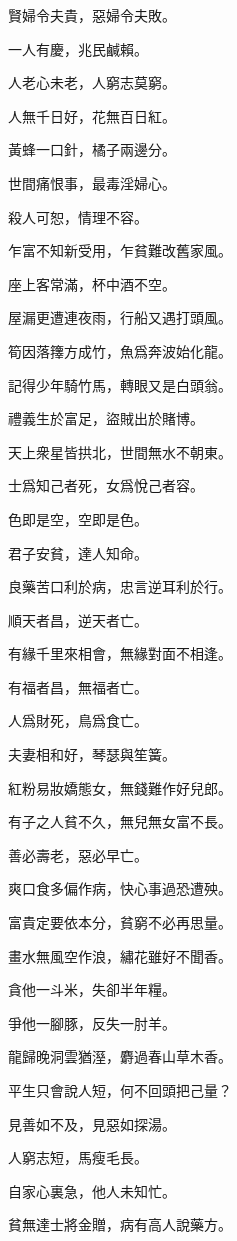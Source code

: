 \documentclass[12pt,a4paper]{ctexbook}
\begin{document}
賢婦令夫貴，惡婦令夫敗。\par
一人有慶，兆民鹹賴。\par
人老心未老，人窮志莫窮。\par
人無千日好，花無百日紅。\par
黃蜂一口針，橘子兩邊分。\par
世間痛恨事，最毒淫婦心。\par
殺人可恕，情理不容。\par
乍富不知新受用，乍貧難改舊家風。\par
座上客常滿，杯中酒不空。\par
屋漏更遭連夜雨，行船又遇打頭風。\par
筍因落籜方成竹，魚爲奔波始化龍。\par
記得少年騎竹馬，轉眼又是白頭翁。\par
禮義生於富足，盜賊出於賭博。\par
天上衆星皆拱北，世間無水不朝東。\par
士爲知己者死，女爲悅己者容。\par
色即是空，空即是色。\par
君子安貧，達人知命。\par
良藥苦口利於病，忠言逆耳利於行。\par
順天者昌，逆天者亡。\par
有緣千里來相會，無緣對面不相逢。\par
有福者昌，無福者亡。\par
人爲財死，鳥爲食亡。\par
夫妻相和好，琴瑟與笙簧。\par
紅粉易妝嬌態女，無錢難作好兒郎。\par
有子之人貧不久，無兒無女富不長。\par
善必壽老，惡必早亡。\par
爽口食多偏作病，快心事過恐遭殃。\par
富貴定要依本分，貧窮不必再思量。\par
畫水無風空作浪，繡花雖好不聞香。\par
貪他一斗米，失卻半年糧。\par
爭他一腳豚，反失一肘羊。\par
龍歸晚洞雲猶溼，麝過春山草木香。\par
平生只會說人短，何不回頭把己量？\par
見善如不及，見惡如探湯。\par
人窮志短，馬瘦毛長。\par
自家心裏急，他人未知忙。\par
貧無達士將金贈，病有高人說藥方。\par
\end{document}
